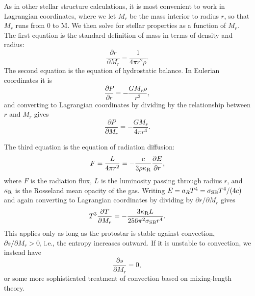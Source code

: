 As in other stellar structure calculations, it is most convenient to work in Lagrangian coordinates, where we let $M_r$ be the mass interior to radius $r$, so that $M_r$ runs from 0 to M. We then solve for stellar properties as a function of $M_r$. The first equation is the standard definition of mass in terms of density and radius:
\begin{equation}
\label{mass}
\frac{\partial r}{\partial M_r} = \frac{1}{4\pi r^2 \rho}.
\end{equation}
The second equation is the equation of hydrostatic balance. In Eulerian coordinates it is
\begin{equation}
\label{eq:hydrobalance}
\frac{\partial P}{\partial r} = -\frac{G M_r \rho}{r^2},
\end{equation}
and converting to Lagrangian coordinates by dividing by the relationship between $r$ and $M_r$ gives
\begin{equation}
\frac{\partial P}{\partial M_r} = -\frac{G M_r}{4\pi r^4}.
\end{equation}

The third equation is the equation of radiation diffusion:
\begin{equation}
F = \frac{L}{4\pi r^2} = -\frac{c}{3\rho\kappa_{\rm R}} \frac{\partial E}{\partial r},
\end{equation}
where $F$ is the radiation flux, $L$ is the luminosity passing through radius $r$, and $\kappa_{\rm R}$ is the Rosseland mean opacity of the gas. Writing $E=a_R T^4 = \sigma_{\rm SB} T^4/(4c)$ and again converting to Lagrangian coordinates by dividing by $\partial r/\partial M_r$ gives
\begin{equation}
T^3 \frac{\partial T}{\partial M_r} = - \frac{3\kappa_{\rm R} L}{256 \pi^2 \sigma_{\rm SB} r^4}.
\end{equation}
This applies only as long as the protostar is stable against convection, $\partial s/\partial M_r > 0$, i.e., the entropy increases outward. If it is unstable to convection, we instead have
\begin{equation}
\frac{\partial s}{\partial M_r} = 0,
\end{equation}
or some more sophisticated treatment of convection based on mixing-length theory.


